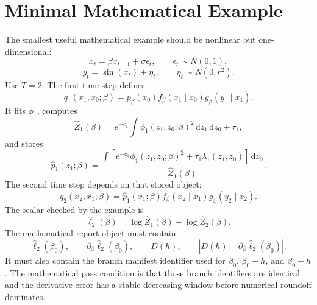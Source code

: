 \documentclass[11pt]{article}
\numberwithin{equation}{section}
\newcommand{\dd}{\,\mathrm d}
\newcommand{\widehatell}{\widehat\ell}
\begin{document}
\section{Minimal Mathematical Example}

The smallest useful mathematical example should be nonlinear but one-dimensional:
\begin{equation}
    x_t=\beta x_{t-1}+\sigma\epsilon_t,
    \qquad
    \epsilon_t\sim N(0,1),
    \label{eq:p24-p19-102}
\end{equation}
\begin{equation}
    y_t=\sin(x_t)+\eta_t,
    \qquad
    \eta_t\sim N(0,r^2).
    \label{eq:p24-p19-103}
\end{equation}
Use \(T=2\).  The first time step defines
\begin{equation}
    q_1(x_1,x_0;\beta)
    =
    p_\beta(x_0)
    f_\beta(x_1\mid x_0)
    g_\beta(y_1\mid x_1).
    \label{eq:p24-p19-104}
\end{equation}
It fits \(\phi_1\), computes
\begin{equation}
    \widehat Z_1(\beta)=e^{-c_1}\int \phi_1(z_1,z_0;\beta)^2
    \dd z_1\dd z_0+\tau_1,
    \label{eq:p24-p19-105}
\end{equation}
and stores
\begin{equation}
    \widehat p_1(z_1;\beta)
    =
    \frac{\int
    \left[e^{-c_1}\phi_1(z_1,z_0;\beta)^2+\tau_1\lambda_1(z_1,z_0)\right]
    \dd z_0}
    {\widehat Z_1(\beta)}.
    \label{eq:p24-p19-106}
\end{equation}
The second time step depends on that stored object:
\begin{equation}
    q_2(x_2,x_1;\beta)
    =
    \widehat p_1(x_1;\beta)
    f_\beta(x_2\mid x_1)
    g_\beta(y_2\mid x_2).
    \label{eq:p24-p19-107}
\end{equation}
The scalar checked by the example is
\begin{equation}
    \widehatell_2(\beta)
    =
    \log\widehat Z_1(\beta)
    +
    \log\widehat Z_2(\beta).
    \label{eq:p24-p19-108}
\end{equation}
The mathematical report object must contain
\begin{equation}
    \widehatell_2(\beta_0),
    \qquad
    \partial_\beta\widehatell_2(\beta_0),
    \qquad
    D(h),
    \qquad
    |D(h)-\partial_\beta\widehatell_2(\beta_0)|.
    \label{eq:p24-p19-109}
\end{equation}
It must also contain the branch manifest identifier used for \(\beta_0\),
\(\beta_0+h\), and \(\beta_0-h\).  The mathematical pass condition is that
those branch identifiers are identical and the derivative error has a stable
decreasing window before numerical roundoff dominates.
\end{document}
